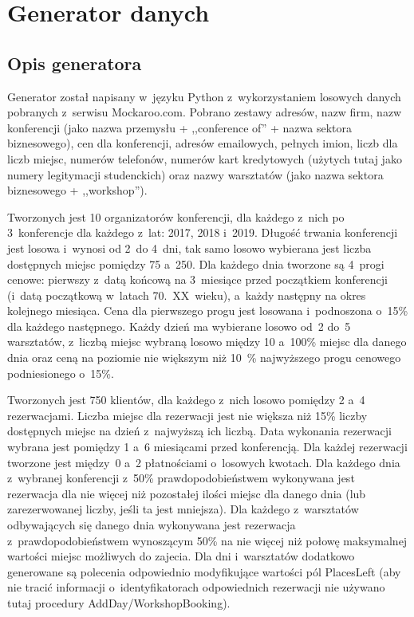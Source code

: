 \documentclass[12pt, a4paper]{mwrep}
\begin{document}
\chapter{Generator danych}

\section{Opis generatora}

Generator został napisany w~języku Python z~wykorzystaniem losowych danych pobranych z~serwisu Mockaroo.com. Pobrano zestawy adresów, nazw firm, nazw konferencji (jako nazwa przemysłu + ,,conference of'' + nazwa sektora biznesowego), cen dla konferencji, adresów e\dywiz{}mailowych, pełnych imion, liczb dla liczb miejsc, numerów telefonów, numerów kart kredytowych (użytych tutaj jako numery legitymacji studenckich) oraz nazwy warsztatów (jako nazwa sektora biznesowego + ,,workshop'').

Tworzonych jest 10 organizatorów konferencji, dla każdego z~nich po 3~konferencje dla każdego z~lat: 2017, 2018 i~2019. Długość trwania konferencji jest losowa i~wynosi od 2~do 4~dni, tak samo losowo wybierana jest liczba dostępnych miejsc pomiędzy 75 a~250. Dla każdego dnia tworzone są 4~progi cenowe: pierwszy z~datą końcową na 3~miesiące przed początkiem konferencji (i~datą początkową w~latach 70.~XX~wieku), a~każdy następny na okres kolejnego miesiąca. Cena dla pierwszego progu jest losowana i~podnoszona o~15\% dla każdego następnego. Każdy dzień ma wybierane losowo od~2 do~5 warsztatów, z~liczbą miejsc wybraną losowo między 10 a~100\% miejsc dla danego dnia oraz ceną na poziomie nie większym niż 10~\% najwyższego progu cenowego podniesionego o~15\%.

Tworzonych jest 750 klientów, dla każdego z~nich losowo pomiędzy 2 a~4 rezerwacjami. Liczba miejsc dla rezerwacji jest nie większa niż 15\% liczby dostępnych miejsc na dzień z~najwyższą ich liczbą. Data wykonania rezerwacji wybrana jest pomiędzy 1 a~6 miesiącami przed konferencją. Dla każdej rezerwacji tworzone jest między~0 a~2 płatnościami o~losowych kwotach. Dla każdego dnia z~wybranej konferencji z~50\% prawdopodobieństwem wykonywana jest rezerwacja dla nie więcej niż pozostałej ilości miejsc dla danego dnia (lub zarezerwowanej liczby, jeśli ta jest mniejsza). Dla każdego z~warsztatów odbywających się danego dnia wykonywana jest rezerwacja z~prawdopodobieństwem wynoszącym 50\% na nie więcej niż połowę maksymalnej wartości miejsc możliwych do zajecia. Dla dni i~warsztatów dodatkowo generowane są polecenia odpowiednio modyfikujące wartości pól PlacesLeft (aby nie tracić informacji o~identyfikatorach odpowiednich rezerwacji nie używano tutaj procedury AddDay/WorkshopBooking).
\end{document}
